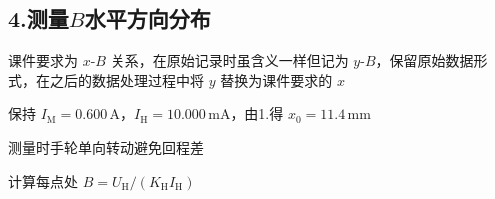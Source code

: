 \documentclass[UTF8,a4paper,zihao=-4,fontset=fandol]{ctexart}
\begin{document}
\begin{samepage}
\section*{4.测量$B$水平方向分布}
\vspace{3mm}
\noindent 课件要求为 $x$-$B$ 关系，在原始记录时虽含义一样但记为 $y$-$B$，保留原始数据形式，在之后的数据处理过程中将 $y$ 替换为课件要求的 $x$\par
\noindent 保持 $I_{\mathrm M}=0.600\,\mathrm A$，$I_{\mathrm H}=10.000\,\mathrm{mA}$，由1.得 $x_0=11.4\,\mathrm{mm}$\par
\noindent 测量时手轮单向转动避免回程差\par
\noindent 计算每点处 $B=U_{\mathrm H}/(K_{\mathrm H}I_{\mathrm H})$\par
\end{samepage}
\end{document}
